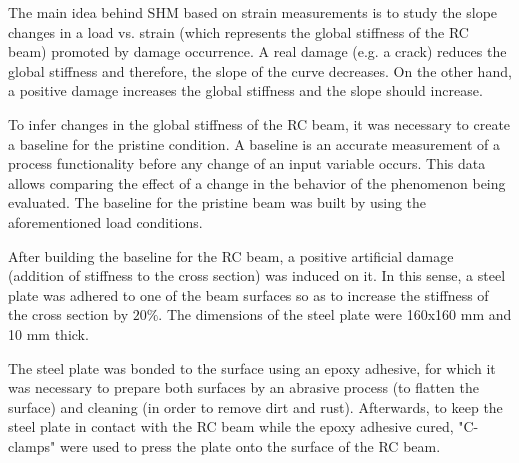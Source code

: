 \documentclass[twocolumn]{bmcart}%
\begin{document}
The main idea behind SHM based on strain measurements is to study the slope changes in a load vs. strain (which represents the global stiffness of the RC beam) promoted by damage occurrence. A real damage (e.g. a crack) reduces the global stiffness and therefore, the slope of the curve decreases. On the other hand, a positive damage increases the global stiffness and the slope should increase.

To infer changes in the global stiffness of the RC beam, it was necessary to create a baseline for the pristine condition. A baseline is an accurate measurement of a process functionality before any change of an input variable occurs. This data allows comparing the effect of a change in the behavior of the phenomenon being evaluated.  The baseline for the pristine beam was built by using the aforementioned load conditions.

\begin{figure}[h!]
  \caption{
      }
      \label{fig6}
      \end{figure}

After building the baseline for the RC beam, a positive artificial damage (addition of stiffness to the cross section) was induced on it. In this sense, a steel plate was adhered to one of the beam surfaces so as to increase the stiffness of the cross section by $20\%$. The dimensions of the steel plate were 160x160 mm and 10 mm thick. 

The steel plate was bonded to the surface using an epoxy adhesive, for which it was necessary to prepare both surfaces by an abrasive process (to flatten the surface) and cleaning (in order to remove dirt and rust). Afterwards, to keep the steel plate in contact with the RC beam while the epoxy adhesive cured, "C-clamps" were used to press the plate onto the surface of the RC beam.
\end{document}
